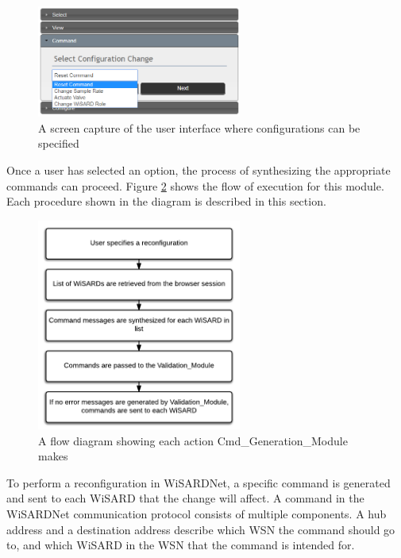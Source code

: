 \begin{figure}[H]
	\centering
	\includegraphics[width=0.6\textwidth]{figures/jsp_ui_cmd.png}
	\caption{A screen capture of the user interface where configurations can be specified}
	\label{fig:jsp_ui_cmd}
\end{figure}

Once a user has selected an option, the process of synthesizing the appropriate commands can proceed. Figure \ref{fig:flow_cmd_generator} shows the flow of execution for this module. Each procedure shown in the diagram is described in this section.\\

\begin{figure}[H]
	\centering
	\includegraphics[width=0.6\textwidth]{figures/flow_diagram_cmd_module.png}
	\caption{A flow diagram showing each action Cmd\_Generation\_Module makes}
	\label{fig:flow_cmd_generator}
\end{figure}

To perform a reconfiguration in WiSARDNet, a specific command is generated and sent to each WiSARD that the change will affect. A command in the WiSARDNet communication protocol consists of multiple components. A hub address and a destination address describe which WSN the command should go to, and which WiSARD in the WSN that the command is intended for.

